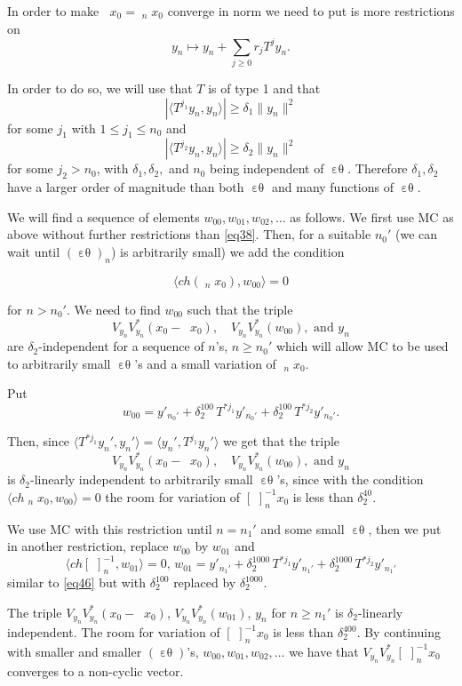 \documentclass[12pt,oneside,reqno]{amsart}
\theoremstyle{definition}
\DeclareMathOperator*{\VV}{[\,\, ]^{-1}}
\DeclareMathOperator*{\VE}{\varepsilon\theta}
\begin{document}
In order to make $\VV x_0 = \VV_n x_0$ converge in norm we need to put is more restrictions on 
$$y_n \mapsto y_n + \sum_{j \ge 0} r_j T^j y_n.$$

In order to do so, we will use that $T$ is of type 1 and that 
$$\left| \langle T^{j_1} y_n, y_n\rangle\right| \ge \delta_1 \|y_n\|^2$$
for some $j_1$ with $1 \le j_1 \le n_0$ and 
$$\left| \langle T^{j_2} y_n, y_n\rangle\right| \ge \delta_2 \|y_n\|^2$$
for some $j_2 > n_0$, with $\delta_1, \delta_2,$ and $n_0$  being independent of $\VE$. Therefore $\delta_1, \delta_2$ have a larger order of magnitude than both $\VE$ and many functions of $\VE$.

We will find a sequence of elements $w_{00}, w_{01}, w_{02},\ldots$ as follows. We first use MC as above without further restrictions than \eqref{eq38}. Then, for a suitable $n_0'$ (we can wait until $(\VE)_n$) is arbitrarily small) we add the condition 

$$\langle ch (\VV_n x_0), w_{00}\rangle = 0$$
 
 for $n > n_0'$. We need to find $w_{00}$ such that the triple 
 $$V_{y_n}V_{y_n}^* (x_0 - \VV x_0), \quad V_{y_n} V_{y_n}^* (w_{00}), \text{ and } y_n$$
are $\delta_2$-independent for a sequence of $n$'s, $n \ge n_0'$ which will allow MC to be used to arbitrarily small $\VE$'s and a small variation of $\VV_n x_0$.

Put 
\begin{equation}\label{eq46}
w_{00} = y'_{n_0'} + \delta_2^{100} \, T^{* j_1} y'_{n_0'} + \delta_2^{100} \, T^{* j_2} y'_{n_0'}.
\end{equation}

Then, since  $\langle T^{* j_1} y_{n}', y_n' \rangle= \langle y_n', T^{j_1} y_n' \rangle$ we get that the triple
$$V_{y_n}V_{y_n}^* (x_0 - \VV x_0), \quad V_{y_n} V_{y_n}^* (w_{00}), \text{ and } y_n$$
is $\delta_2$-linearly independent to arbitrarily small $\VE$'s, since with the condition $\langle ch \VV_n x_0, w_{00}\rangle = 0$ the room for variation of $[\, \,]^{-1}_n x_0$ is less than $\delta_2^{40}$.

We use MC with this restriction until $n = n_1'$ and some small $\VE$, then we put in another restriction, replace $w_{00}$ by $w_{01}$ and 
$$\langle ch [\, \,]^{-1}_n, w_{01}\rangle = 0, \, w_{01} = y'_{n_1'} + \delta_2^{1000} \, T^{* j_1} y'_{n_1'} + \delta_2^{1000}\,  T^{* j_2} y'_{n_1'}$$
similar to \eqref{eq46} but with $\delta_2^{100}$ replaced by $\delta_2^{1000}$.

The triple $V_{y_n} V_{y_n}^* (x_0 - \VV x_0)$, $V_{y_n} V_{y_n}^* (w_{01})$, $y_n$ for $n \ge n_1'$ is $\delta_2$-linearly independent. The room for variation of $[\, \,]^{-1}_n x_0$ is less than $\delta_2^{400}$. By continuing with smaller and smaller $(\VE)$'s, $w_{00}, w_{01}, w_{02}, \ldots$ we have that $V_{y_n} V_{y_n}^* [\,\,]^{-1}_n x_0$ converges to a non-cyclic vector.
\end{document}
